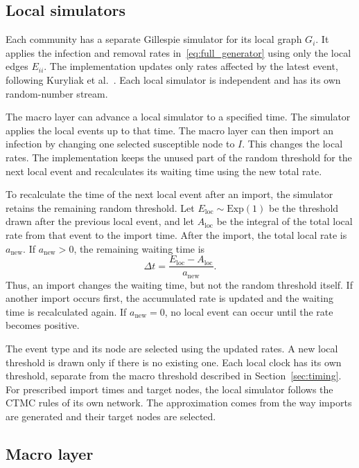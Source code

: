 \documentclass{ieeeaccess}
\begin{document}
\subsection{Local simulators}
\label{sec:local}

Each community has a separate Gillespie simulator for its local graph $G_i$. It applies the infection and removal rates in~\eqref{eq:full_generator} using only the local edges $E_{ii}$. The implementation updates only rates affected by the latest event, following Kuryliak et al.~\cite{kuryliak2025simulating}. Each local simulator is independent and has its own random-number stream.

The macro layer can advance a local simulator to a specified time. The simulator applies the local events up to that time. The macro layer can then import an infection by changing one selected susceptible node to $I$. This changes the local rates. The implementation keeps the unused part of the random threshold for the next local event and recalculates its waiting time using the new total rate.

To recalculate the time of the next local event after an import, the simulator retains the remaining random threshold. Let $E_{\mathrm{loc}}\sim\mathrm{Exp}(1)$ be the threshold drawn after the previous local event, and let $A_{\mathrm{loc}}$ be the integral of the total local rate from that event to the import time. After the import, the total local rate is $a_{\mathrm{new}}$. If $a_{\mathrm{new}}>0$, the remaining waiting time is
\[
\Delta t=
\frac{E_{\mathrm{loc}}-A_{\mathrm{loc}}}{a_{\mathrm{new}}}.
\]
Thus, an import changes the waiting time, but not the random threshold itself. If another import occurs first, the accumulated rate is updated and the waiting time is recalculated again. If $a_{\mathrm{new}}=0$, no local event can occur until the rate becomes positive.

The event type and its node are selected using the updated rates. A new local threshold is drawn only if there is no existing one. Each local clock has its own threshold, separate from the macro threshold described in Section~\ref{sec:timing}. For prescribed import times and target nodes, the local simulator follows the CTMC rules of its own network. The approximation comes from the way imports are generated and their target nodes are selected.

\subsection{Macro layer}
\label{sec:macro}
\end{document}
